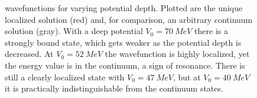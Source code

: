 \documentclass[../main/report.tex]{subfiles}
\begin{document}

\begin{figure}[H]
  \caption{
     wavefunctions for varying potential depth. 
    Plotted are the unique localized solution (red) and, for comparison, an arbitrary continuum solution (gray).
    With a deep potential $V_0 = \SI{70}{MeV}$ there is a strongly bound state, which gets weaker as the potential depth is decreased.
    At $V_0 = \SI{52}{MeV}$ the wavefunction is highly localized, yet the energy value is in the continuum, a sign of resonance.
    There is still a clearly localized state with $V_0 = \SI{47}{MeV}$, but at $V_0 = \SI{40}{MeV}$ it is practically indistinguishable from the continuum states.
  } 
  \label{fig:wavefunctions}
  \end{figure}

\end{document}
